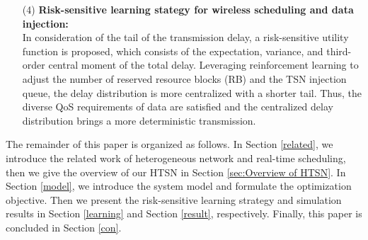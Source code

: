 \documentclass{SCIS2021}
\begin{document}
	\begin{itemize}[itemsep= 15 pt,topsep = -0 pt]
		\item[(4)]
		\textbf{Risk-sensitive learning stategy for wireless scheduling and data injection:}\\
		In consideration of the tail of the transmission delay, a risk-sensitive utility function is proposed, which consists of the expectation, variance, and third-order central moment of the total delay. Leveraging reinforcement learning to adjust the number of reserved resource blocks (RB) and the TSN injection queue, the delay distribution is more centralized with a shorter tail. Thus, the diverse QoS requirements of data are satisfied and the centralized delay distribution brings a more deterministic transmission.
	\end{itemize}
	
	{\color{blue}The remainder of this paper is organized as follows. In Section \ref{related}, we introduce the related work of heterogeneous network and real-time scheduling, then we give the overview of our HTSN in Section \ref{sec:Overview of HTSN}. In Section \ref{model}, we introduce the system model and formulate the optimization objective. Then we present the risk-sensitive learning strategy and simulation results in Section \ref{learning} and Section \ref{result}, respectively. Finally, this paper is concluded in Section \ref{con}.}
	
\end{document}
